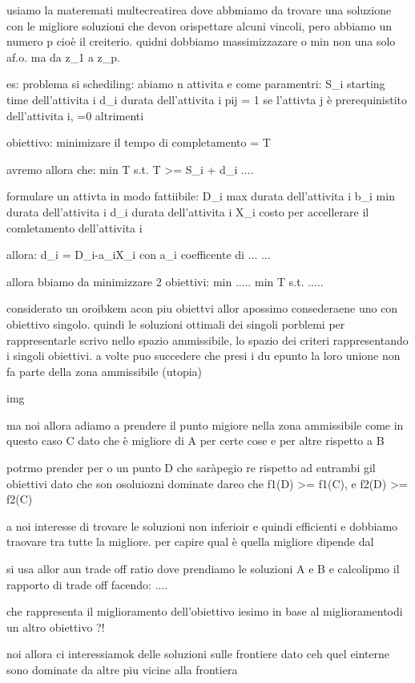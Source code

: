 usiamo la materemati multecreatirea dove abbmiamo da trovare una soluzione con le migliore soluzioni che devon orispettare alcuni vincoli, pero abbiamo un numero p cioè il creiterio. quidni dobbiamo massimizzazare o min non una solo af.o. ma da z_1 a z_p.

es: problema si schediling:
abiamo n attivita e come paramentri:
S_i starting time dell'attivita i
d_i durata dell'attivita i
pij = 1 se l'attivta j è prerequinistito dell'attivita i, =0 altrimenti

obiettivo: minimizare il tempo di completamento = T


avremo allora che:
min T
s.t.
T >= S_i + d_i ....



formulare un attivta in modo fattiibile:
D_i max durata dell'attivita i
b_i min durata dell'attivita i
d_i durata dell'attivita i
X_i costo per accellerare il comletamento dell'attivita i

allora:
d_i = D_i-a_iX_i con a_i coefficente di ...
...

allora bbiamo da minimizzare 2 obiettivi:
min \sum .....
min T
s.t.
.....


considerato un oroibkem acon piu obiettvi allor apossimo consederaene uno con obiettivo singolo. quindi le soluzioni ottimali dei singoli porblemi per rappresentarle scrivo nello spazio ammissibile, lo spazio dei criteri rappresentando i singoli obiettivi. a volte puo succedere che presi i du epunto la loro unione non fa parte della zona ammissibile (utopia)

img

ma noi allora adiamo a prendere il punto migiore nella zona ammissibile come in questo caso C dato che è migliore di A per certe cose e per altre rispetto a B

potrmo prender per o un punto D che saràpegio re rispetto ad entrambi gil obiettivi dato che son osoluiozni dominate dareo che f1(D) >= f1(C), e f2(D) >= f2(C)

a noi interesse di trovare le soluzioni non inferioir e quindi efficienti e dobbiamo traovare tra tutte la migliore. per capire qual è quella migliore dipende dal 


si usa allor aun trade off ratio dove prendiamo le soluzioni A e B e calcolipmo il rapporto di trade off facendo:
....

che rappresenta il miglioramento dell'obiettivo iesimo in base al miglioramentodi un altro obiettivo ?!

noi allora ci interessiamok delle soluzioni sulle frontiere dato ceh quel einterne sono dominate da altre piu vicine alla frontiera

